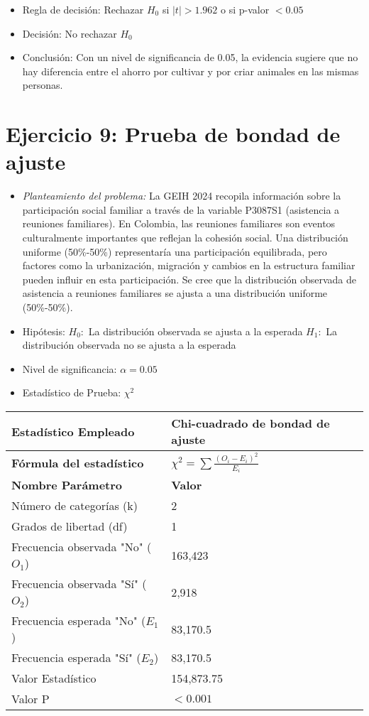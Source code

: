 \documentclass[12pt,a4paper]{article}
\begin{document}
\begin{itemize}
    \item Regla de decisión: Rechazar $H_0$ si $|t| > 1.962$ o si p-valor $< 0.05$
    \item Decisión: No rechazar $H_0$
    \item Conclusión: Con un nivel de significancia de 0.05, la evidencia sugiere que no hay diferencia entre el ahorro por cultivar y por criar animales en las mismas personas.
\end{itemize}

\section*{Ejercicio 9: Prueba de bondad de ajuste}
\begin{itemize}
    \item \textit{Planteamiento del problema:} La GEIH 2024 recopila información sobre la participación social familiar a través de la variable P3087S1 (asistencia a reuniones familiares). En Colombia, las reuniones familiares son eventos culturalmente importantes que reflejan la cohesión social. Una distribución uniforme (50\%-50\%) representaría una participación equilibrada, pero factores como la urbanización, migración y cambios en la estructura familiar pueden influir en esta participación. Se cree que la distribución observada de asistencia a reuniones familiares se ajusta a una distribución uniforme (50\%-50\%).
    \item Hipótesis: \quad $H_{0}:$ La distribución observada se ajusta a la esperada \hspace{1cm} $H_{1}:$ La distribución observada no se ajusta a la esperada
    \item Nivel de significancia: $\alpha = 0.05$
    \item Estadístico de Prueba: $\chi^2$
\end{itemize}

\begin{tabular}{|m{7cm}|m{7cm}|}
\hline
\textbf{Estadístico Empleado} & Chi-cuadrado de bondad de ajuste \\ \hline
\textbf{Fórmula del estadístico} & $\chi^2 = \sum \frac{(O_i - E_i)^2}{E_i}$ \\ \hline
\textbf{Nombre Parámetro} & \textbf{Valor} \\ \hline
Número de categorías (k) & 2 \\ \hline
Grados de libertad (df) & 1 \\ \hline
Frecuencia observada "No" ($O_1$) & 163,423 \\ \hline
Frecuencia observada "Sí" ($O_2$) & 2,918 \\ \hline
Frecuencia esperada "No" ($E_1$) & 83,170.5 \\ \hline
Frecuencia esperada "Sí" ($E_2$) & 83,170.5 \\ \hline
Valor Estadístico & 154,873.75 \\ \hline
Valor P & $< 0.001$ \\ \hline
\end{tabular}
\end{document}
